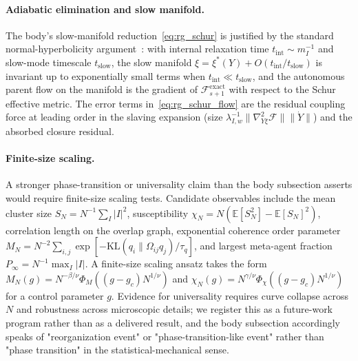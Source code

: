 \documentclass[11pt]{article}
\begin{document}
\paragraph{Adiabatic elimination and slow manifold.}
The body's slow-manifold reduction~\eqref{eq:rg_schur} is justified by the standard normal-hyperbolicity argument~\cite{fenichel1979geometric}: with internal relaxation time $t_{\mathrm{int}} \sim m_I^{-1}$ and slow-mode timescale $t_{\mathrm{slow}}$, the slow manifold $\xi = \xi^*(Y) + O(t_{\mathrm{int}}/t_{\mathrm{slow}})$ is invariant up to exponentially small terms when $t_{\mathrm{int}} \ll t_{\mathrm{slow}}$, and the autonomous parent flow on the manifold is the gradient of $\mathcal{F}_{s+1}^{\mathrm{exact}}$ with respect to the Schur effective metric. The error terms in~\eqref{eq:rg_schur_flow} are the residual coupling force at leading order in the slaving expansion (size $\lambda_{I,w}^{-1}\|\nabla^2_{Y\xi}\mathcal{F}\|\|\dot Y\|$) and the absorbed closure residual.

\paragraph{Finite-size scaling.}
A stronger phase-transition or universality claim than the body subsection asserts would require finite-size scaling tests. Candidate observables include the mean cluster size $S_N = N^{-1}\sum_I |I|^2$, susceptibility $\chi_N = N(\mathbb{E}[S_N^2] - \mathbb{E}[S_N]^2)$, correlation length on the overlap graph, exponential coherence order parameter $M_N = N^{-2}\sum_{i,j}\exp[-\mathrm{KL}(q_i \| \Omega_{ij}q_j)/\tau_q]$, and largest meta-agent fraction $P_\infty = N^{-1}\max_I |I|$. A finite-size scaling ansatz takes the form $M_N(g) = N^{-\beta/\nu}\Phi_M((g - g_c)N^{1/\nu})$ and $\chi_N(g) = N^{\gamma/\nu}\Phi_\chi((g - g_c)N^{1/\nu})$ for a control parameter $g$. Evidence for universality requires curve collapse across $N$ and robustness across microscopic details; we register this as a future-work program rather than as a delivered result, and the body subsection accordingly speaks of "reorganization event" or "phase-transition-like event" rather than "phase transition" in the statistical-mechanical sense.
\end{document}
